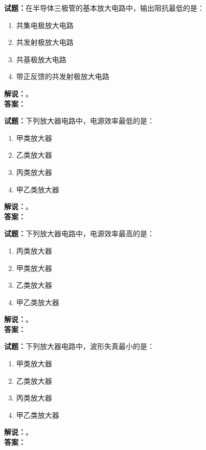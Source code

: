 \documentclass{ctexbook}
\begin{document}
\bigskip




\noindent\textbf{试题：}在半导体三极管的基本放大电路中，输出阻抗最低的是：
\begin{enumerate}[leftmargin=3em]
\item 共集电极放大电路
\item 共发射极放大电路
\item 共基极放大电路
\item 带正反馈的共发射极放大电路
\end{enumerate}
\noindent\textbf{解说：}\textbf{}。\\\noindent\textbf{答案：}

\bigskip




\noindent\textbf{试题：}下列放大器电路中，电源效率最低的是：
\begin{enumerate}[leftmargin=3em]
\item 甲类放大器
\item 乙类放大器
\item 丙类放大器
\item 甲乙类放大器
\end{enumerate}
\noindent\textbf{解说：}\textbf{}。\\\noindent\textbf{答案：}

\bigskip




\noindent\textbf{试题：}下列放大器电路中，电源效率最高的是：
\begin{enumerate}[leftmargin=3em]
\item 丙类放大器
\item 甲类放大器
\item 乙类放大器
\item 甲乙类放大器
\end{enumerate}
\noindent\textbf{解说：}\textbf{}。\\\noindent\textbf{答案：}

\bigskip




\noindent\textbf{试题：}下列放大器电路中，波形失真最小的是：
\begin{enumerate}[leftmargin=3em]
\item 甲类放大器
\item 乙类放大器
\item 丙类放大器
\item 甲乙类放大器
\end{enumerate}
\noindent\textbf{解说：}\textbf{}。\\\noindent\textbf{答案：}
\end{document}
